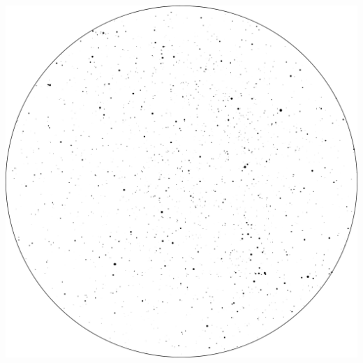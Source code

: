 \documentclass{./SAS-class-skygen}
\begin{document}
	\vspace{0.5cm}
    \begin{center}
    \includegraphics[width=\textwidth]{./pics/skychart3.png}
    \end{center}
    
    
\end{document}
